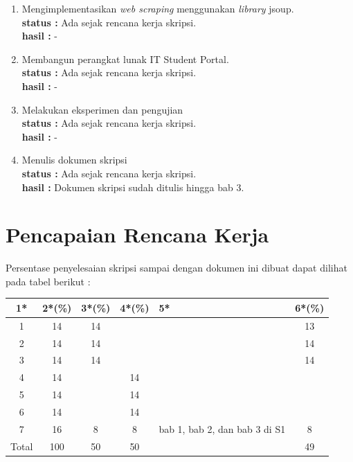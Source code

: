 \documentclass[a4paper,twoside]{article}
\begin{document}
\begin{enumerate}
\begin{enumerate}
		\item Mengimplementasikan \textit{web scraping} menggunakan \textit{library} jsoup.\\
		{\bf status :} Ada sejak rencana kerja skripsi.\\
		{\bf hasil :} -
		\item Membangun perangkat lunak IT Student Portal.\\
		{\bf status :} Ada sejak rencana kerja skripsi.\\
		{\bf hasil :} -

		\item Melakukan eksperimen dan pengujian\\
		{\bf status :} Ada sejak rencana kerja skripsi.\\
		{\bf hasil :} -

		\item Menulis dokumen skripsi\\
		{\bf status :} Ada sejak rencana kerja skripsi.\\
		{\bf hasil :} Dokumen skripsi sudah ditulis hingga bab 3.

	\end{enumerate}
\end{enumerate}






\section{Pencapaian Rencana Kerja}
Persentase penyelesaian skripsi sampai dengan dokumen ini dibuat dapat dilihat pada tabel berikut :

\begin{center}
  \begin{tabular}{ | c | c | c | c | l | c |}
    \hline
    1*  & 2*(\%) & 3*(\%) & 4*(\%) &5* &6*(\%)\\ \hline \hline
   1   & 14  & 14  &  &  & 13\\ \hline
    2   & 14 & 14  &   &  & 14\\ \hline
    3   & 14  & 14  &  &  & 14\\ \hline
    4   & 14  &   &  14 &  & \\ \hline
    5   & 14  &   & 14 &  & \\ \hline
    6   & 14 &   & 14  &  & \\ \hline
    7   & 16  & 8  & 8 &  {\footnotesize bab 1, bab 2, dan bab 3 di S1} & 8\\ \hline
    Total  & 100  & 50  & 50 &  & 49\\ \hline
                          \end{tabular}										
\end{center}
\end{document}
